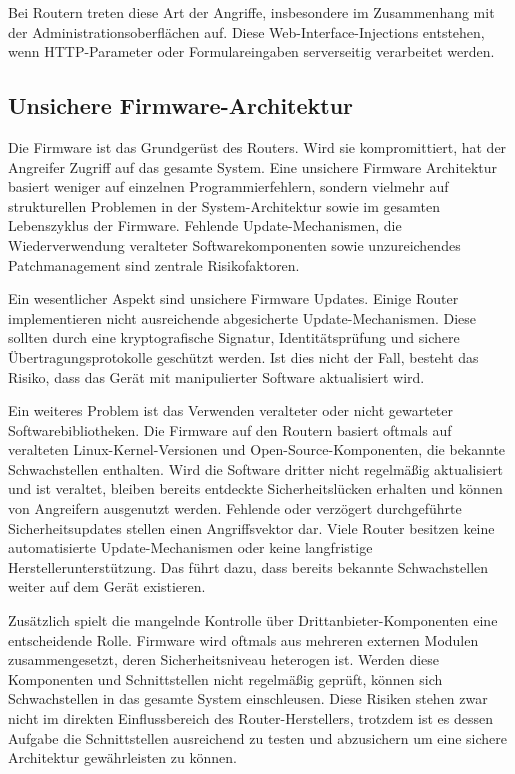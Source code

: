 	Bei Routern treten diese Art der Angriffe, insbesondere im Zusammenhang mit der Administrationsoberflächen
	auf. Diese Web-Interface-Injections entstehen, wenn HTTP-Parameter oder Formulareingaben serverseitig
	verarbeitet werden. \cite{cwecwe77improper, cwecwe20improper}

	\subsection{Unsichere Firmware-Architektur}	
	Die Firmware ist das Grundgerüst des Routers. Wird sie kompromittiert, hat der Angreifer Zugriff auf das gesamte System.
	Eine unsichere Firmware Architektur basiert weniger auf einzelnen Programmierfehlern, sondern vielmehr
	auf strukturellen Problemen in der System-Architektur sowie im gesamten Lebenszyklus der Firmware.
	Fehlende Update-Mechanismen, die Wiederverwendung veralteter Softwarekomponenten sowie unzureichendes
	Patchmanagement sind zentrale Risikofaktoren.

	Ein wesentlicher Aspekt sind unsichere Firmware Updates. Einige Router implementieren nicht ausreichende
	abgesicherte Update-Mechanismen. Diese sollten durch eine kryptografische Signatur, Identitätsprüfung und
	sichere Übertragungsprotokolle geschützt werden. Ist dies nicht der Fall, besteht das Risiko, dass das
	Gerät mit manipulierter Software aktualisiert wird.

	Ein weiteres Problem ist das Verwenden veralteter oder nicht gewarteter Softwarebibliotheken.
	Die Firmware auf den Routern basiert oftmals auf veralteten Linux-Kernel-Versionen und
	Open-Source-Komponenten, die bekannte Schwachstellen enthalten. Wird die Software dritter nicht regelmäßig
	aktualisiert und ist veraltet, bleiben bereits entdeckte Sicherheitslücken erhalten und können 
	von Angreifern ausgenutzt werden. Fehlende oder verzögert durchgeführte Sicherheitsupdates
	stellen einen Angriffsvektor dar. Viele Router besitzen keine automatisierte Update-Mechanismen oder
	keine langfristige Herstellerunterstützung. Das führt dazu, dass bereits bekannte Schwachstellen
	weiter auf dem Gerät existieren.

	Zusätzlich spielt die mangelnde Kontrolle über Drittanbieter-Komponenten eine entscheidende Rolle.
	Firmware wird oftmals aus mehreren externen Modulen zusammengesetzt, deren Sicherheitsniveau heterogen ist.
	Werden diese Komponenten und Schnittstellen nicht regelmäßig geprüft, können sich Schwachstellen in das 
	gesamte System einschleusen. Diese Risiken stehen zwar nicht im direkten Einflussbereich des 
	Router-Herstellers, trotzdem ist es dessen Aufgabe die Schnittstellen ausreichend zu testen und abzusichern
	um eine sichere Architektur gewährleisten zu können. \cite{bakhshi2024, qasem2024}

